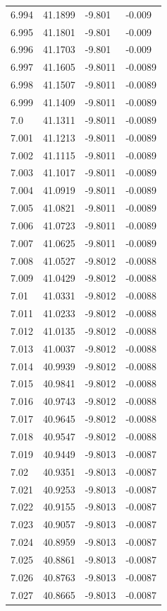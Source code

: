 \begin{tabular}{llll}
6.994 & 41.1899 & -9.801 & -0.009 \\
6.995 & 41.1801 & -9.801 & -0.009 \\
6.996 & 41.1703 & -9.801 & -0.009 \\
6.997 & 41.1605 & -9.8011 & -0.0089 \\
6.998 & 41.1507 & -9.8011 & -0.0089 \\
6.999 & 41.1409 & -9.8011 & -0.0089 \\
7.0 & 41.1311 & -9.8011 & -0.0089 \\
7.001 & 41.1213 & -9.8011 & -0.0089 \\
7.002 & 41.1115 & -9.8011 & -0.0089 \\
7.003 & 41.1017 & -9.8011 & -0.0089 \\
7.004 & 41.0919 & -9.8011 & -0.0089 \\
7.005 & 41.0821 & -9.8011 & -0.0089 \\
7.006 & 41.0723 & -9.8011 & -0.0089 \\
7.007 & 41.0625 & -9.8011 & -0.0089 \\
7.008 & 41.0527 & -9.8012 & -0.0088 \\
7.009 & 41.0429 & -9.8012 & -0.0088 \\
7.01 & 41.0331 & -9.8012 & -0.0088 \\
7.011 & 41.0233 & -9.8012 & -0.0088 \\
7.012 & 41.0135 & -9.8012 & -0.0088 \\
7.013 & 41.0037 & -9.8012 & -0.0088 \\
7.014 & 40.9939 & -9.8012 & -0.0088 \\
7.015 & 40.9841 & -9.8012 & -0.0088 \\
7.016 & 40.9743 & -9.8012 & -0.0088 \\
7.017 & 40.9645 & -9.8012 & -0.0088 \\
7.018 & 40.9547 & -9.8012 & -0.0088 \\
7.019 & 40.9449 & -9.8013 & -0.0087 \\
7.02 & 40.9351 & -9.8013 & -0.0087 \\
7.021 & 40.9253 & -9.8013 & -0.0087 \\
7.022 & 40.9155 & -9.8013 & -0.0087 \\
7.023 & 40.9057 & -9.8013 & -0.0087 \\
7.024 & 40.8959 & -9.8013 & -0.0087 \\
7.025 & 40.8861 & -9.8013 & -0.0087 \\
7.026 & 40.8763 & -9.8013 & -0.0087 \\
7.027 & 40.8665 & -9.8013 & -0.0087 \\

\end{tabular}
